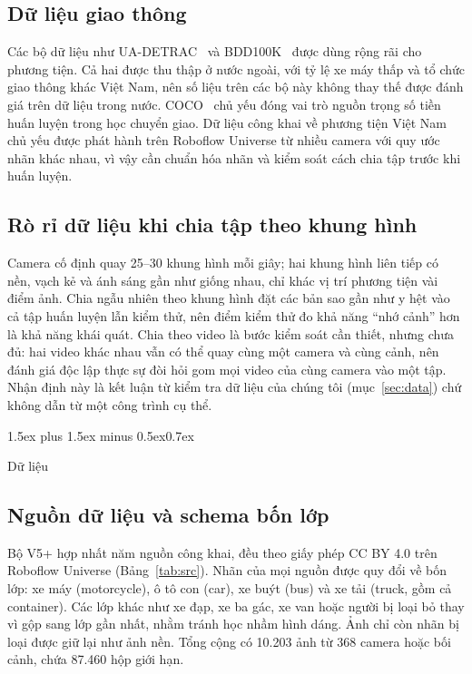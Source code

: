 \documentclass[10pt,journal,letterpaper]{IEEEtran}
\makeatletter
\renewcommand\section{\@startsection{section}{1}{\z@}%
  {1.5ex plus 1.5ex minus 0.5ex}{0.7ex}{\normalfont\scshape\raggedright}}
\makeatother
\begin{document}
\subsection{Dữ liệu giao thông}
Các bộ dữ liệu như UA-DETRAC~\cite{detrac} và BDD100K~\cite{bdd} được dùng rộng rãi cho phương tiện. Cả hai được thu thập ở nước ngoài, với tỷ lệ xe máy thấp và tổ chức giao thông khác Việt Nam, nên số liệu trên các bộ này không thay thế được đánh giá trên dữ liệu trong nước. COCO~\cite{coco} chủ yếu đóng vai trò nguồn trọng số tiền huấn luyện trong học chuyển giao. Dữ liệu công khai về phương tiện Việt Nam chủ yếu được phát hành trên Roboflow Universe từ nhiều camera với quy ước nhãn khác nhau, vì vậy cần chuẩn hóa nhãn và kiểm soát cách chia tập trước khi huấn luyện.

\subsection{Rò rỉ dữ liệu khi chia tập theo khung hình}
Camera cố định quay 25--30 khung hình mỗi giây; hai khung hình liên tiếp có nền, vạch kẻ và ánh sáng gần như giống nhau, chỉ khác vị trí phương tiện vài điểm ảnh. Chia ngẫu nhiên theo khung hình đặt các bản sao gần như y hệt vào cả tập huấn luyện lẫn kiểm thử, nên điểm kiểm thử đo khả năng ``nhớ cảnh'' hơn là khả năng khái quát. Chia theo video là bước kiểm soát cần thiết, nhưng chưa đủ: hai video khác nhau vẫn có thể quay cùng một camera và cùng cảnh, nên đánh giá độc lập thực sự đòi hỏi gom mọi video của cùng camera vào một tập. Nhận định này là kết luận từ kiểm tra dữ liệu của chúng tôi (mục~\ref{sec:data}) chứ không dẫn từ một công trình cụ thể.

\section{Dữ liệu}\label{sec:data}
\subsection{Nguồn dữ liệu và schema bốn lớp}
Bộ V5+ hợp nhất năm nguồn công khai, đều theo giấy phép CC BY 4.0 trên Roboflow Universe (Bảng~\ref{tab:src}). Nhãn của mọi nguồn được quy đổi về bốn lớp: xe máy (motorcycle), ô tô con (car), xe buýt (bus) và xe tải (truck, gồm cả container). Các lớp khác như xe đạp, xe ba gác, xe van hoặc người bị loại bỏ thay vì gộp sang lớp gần nhất, nhằm tránh học nhầm hình dáng. Ảnh chỉ còn nhãn bị loại được giữ lại như ảnh nền. Tổng cộng có 10.203 ảnh từ 368 camera hoặc bối cảnh, chứa 87.460 hộp giới hạn.
\end{document}
